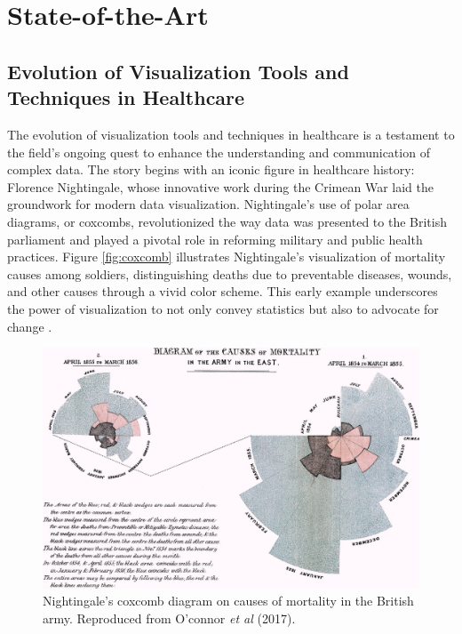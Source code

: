 \section{State-of-the-Art}\label{state-of-the-art}

\subsection{Evolution of Visualization Tools and Techniques in Healthcare}\label{evolution-of-visualization-tools-and-techniques-in-healthcare}

The evolution of visualization tools and techniques in healthcare is a testament to the field's ongoing quest to enhance the understanding and communication of complex data. The story begins with an iconic figure in healthcare history: Florence Nightingale, whose innovative work during the Crimean War laid the groundwork for modern data visualization. Nightingale's use of polar area diagrams, or coxcombs, revolutionized the way data was presented to the British parliament and played a pivotal role in reforming military and public health practices. Figure \ref{fig:coxcomb} illustrates Nightingale's visualization of mortality causes among soldiers, distinguishing deaths due to preventable diseases, wounds, and other causes through a vivid color scheme. This early example underscores the power of visualization to not only convey statistics but also to advocate for change \cite{soa7}.

\begin{figure}[ht]
  \centering
  \includegraphics[width=\textwidth]{media/fig20.jpeg}
  \caption{Nightingale's coxcomb diagram on causes of mortality in the British army. Reproduced from O'connor \textit{et al} (2017)\cite{soa7}.}
  \label{fig:vsc}
\end{figure}

